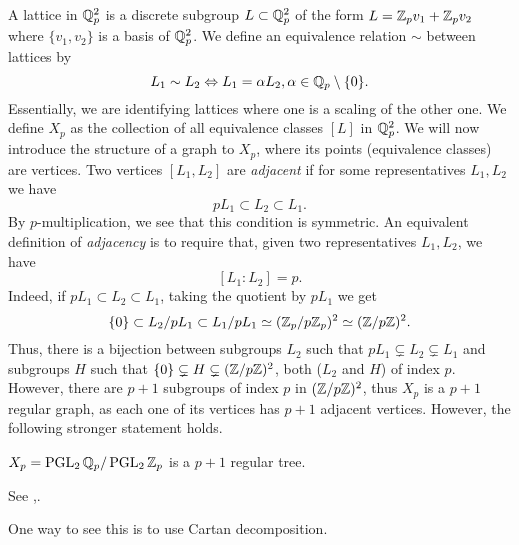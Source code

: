 A lattice in $\mathbb{Q}_{p}^{2}$ is a discrete subgroup $L\subset\mathbb{Q}_{p}^{2}$ of the form $L=\mathbb{Z}_{p}v_{1}+\mathbb{Z}_{p}v_{2}$ where $\{v_{1},v_{2}\}$ is a basis of $\mathbb{Q}_{p}^{2}$. We define an equivalence relation $\sim$ between lattices by
\begin{equation}
\label{eq:rel_equiv_lattice}
L_{1}\sim L_{2}\Leftrightarrow L_{1}=\alpha L_{2},\alpha\in\mathbb{Q}_{p}\setminus\{0\}.
\end{equation}
Essentially, we are identifying lattices where one is a scaling of the other one. We define $X_{p}$ as the collection of all equivalence classes $[L]$ in $\mathbb{Q}_{p}^{2}$. We will now introduce the structure of a graph to $X_{p}$, where its points (equivalence classes) are vertices. Two vertices $[L_{1},L_{2}]$ are \emph{adjacent} if for some representatives $L_{1},L_{2}$ we have
\[
pL_{1}\subset L_{2}\subset L_{1}.
\]
By $p$-multiplication, we see that this condition is symmetric. An equivalent definition of \emph{adjacency} is to require that, given two representatives $L_{1},L_{2}$, we have
\[
[L_{1}\colon L_{2}]=p.
\]
Indeed, if $pL_{1}\subset L_{2}\subset L_{1}$, taking the quotient by $pL_{1}$ we get
\[
\{0\}\subset L_{2}/pL_{1}\subset L_{1}/pL_{1}\simeq(\mathbb{Z}_{p}/p\mathbb{Z}_{p})^{2}\simeq(\mathbb{Z}/p\mathbb{Z})^{2}.
\]
Thus, there is a bijection between subgroups $L_{2}$ such that $pL_{1}\subsetneq L_{2}\subsetneq L_{1}$ and subgroups $H$ such that $\{0\}\subsetneq H\subsetneq(\mathbb{Z}/p\mathbb{Z})^{2}$, both ($L_{2}$ and $H$) of index $p$. However, there are $p+1$ subgroups of index $p$ in $(\mathbb{Z}/p\mathbb{Z})^{2}$, thus $X_{p}$ is a $p+1$ regular graph, as each one of its vertices has $p+1$ adjacent vertices. However, the following stronger statement holds.


\begin{nprop}
\label{prop:tree_structure}
$X_{p}=\operatorname{PGL}_{2}\mathbb{Q}_{p}/\operatorname{PGL}_{2}\mathbb{Z}_{p}$ is a $p+1$ regular tree.
\end{nprop}
\begin{prf}
See \cite{bergeron:spectrum},\cite{EinTW:AQUE}.
\end{prf}

One way to see this is to use Cartan decomposition.


